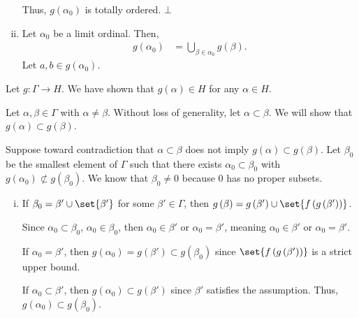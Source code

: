 \documentclass[10pt]{mypackage}
\begin{document}
\begin{solution}
\begin{enumerate}[(i)]
      Thus, $g\left(\alpha_0\right)$ is totally ordered. $\bot$
    \item Let $\alpha_0$ be a limit ordinal. Then,
      \begin{align*}
        g\left(\alpha_0\right) &= \bigcup_{\beta \in \alpha_0} g\left(\beta\right).
      \end{align*}
      Let $a,b\in g\left(\alpha_0\right)$. 
  \end{enumerate}
  Let $g: \Gamma \rightarrow H$. We have shown that $g(\alpha) \in H$ for any $\alpha \in H$.\newline

  Let $\alpha,\beta \in \Gamma$ with $\alpha \neq \beta$. Without loss of generality, let $\alpha \subset \beta$. We will show that $g\left(\alpha\right) \subset g\left(\beta\right)$.\newline
  
  Suppose toward contradiction that $\alpha\subset \beta$ does not imply $g\left(\alpha\right)\subset g\left(\beta\right)$. Let $\beta_0$ be the smallest element of $\Gamma$ such that there exists $\alpha_0\subset \beta_0$ with $g\left(\alpha_0\right)\nsubset g\left(\beta_0\right)$. We know that $\beta_0\neq 0$ because $0$ has no proper subsets.
  \begin{enumerate}[(i)]
    \item If $\beta_0 = \beta' \cup \set{\beta'}$ for some $\beta'\in \Gamma$, then $g\left(\beta\right) = g\left(\beta'\right)\cup \set{f\left(g\left(\beta'\right)\right)}$.\newline

      Since $\alpha_0 \subset \beta_0$, $\alpha_0\in \beta_0$, then $\alpha_0 \in \beta'$ or $\alpha_0 = \beta'$, meaning $\alpha_0\in \beta'$ or $\alpha_0 = \beta'$.\newline

      If $\alpha_0 = \beta'$, then $g\left(\alpha_0\right) = g\left(\beta'\right)\subset g\left(\beta_0\right)$ since $\set{f\left(g\left(\beta'\right)\right)}$ is a strict upper bound.\newline

      If $\alpha_0 \subset \beta'$, then $g\left(\alpha_0\right) \subset g\left(\beta'\right)$ since $\beta'$ satisfies the assumption. Thus, $g\left(\alpha_0\right)\subset g\left(\beta_0\right)$.
  \end{enumerate}
\end{solution}
\end{document}

